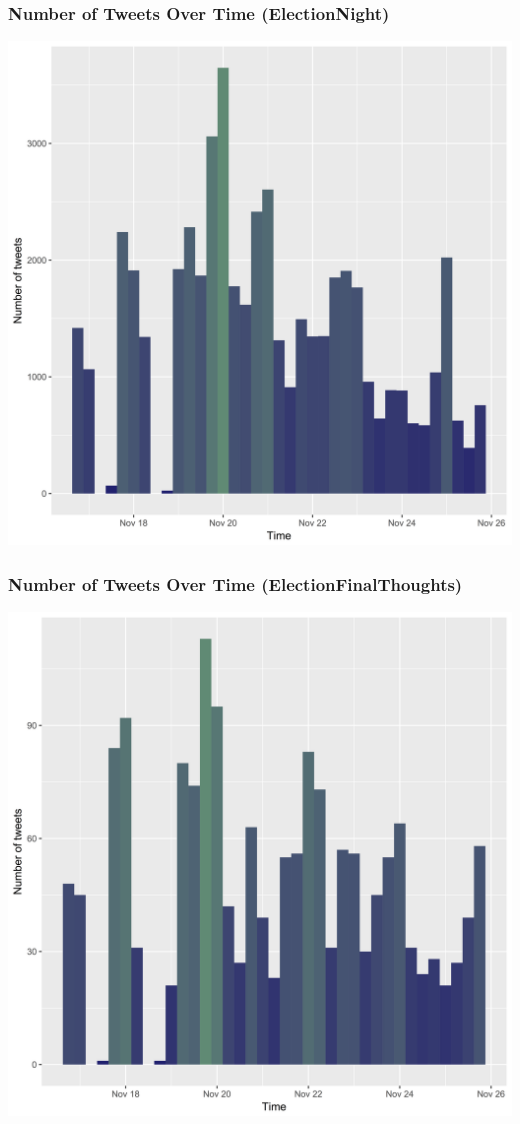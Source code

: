 \documentclass{beamer}
\begin{document}
\begin{frame}
	\frametitle{Number of Tweets Over Time (ElectionNight)}
  \includegraphics[height = 0.9\textheight]{enfreq}
\end{frame}

\begin{frame}
	\frametitle{Number of Tweets Over Time (ElectionFinalThoughts)}
  \includegraphics[height = 0.9\textheight]{eftfreq}
\end{frame}
\end{document}
